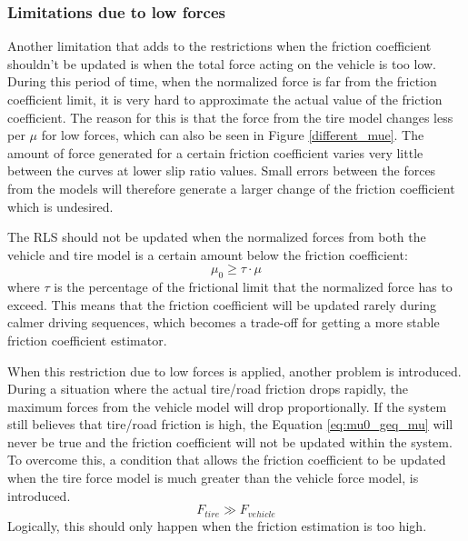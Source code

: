 \subsubsection{Limitations due to low forces}
Another limitation that adds to the restrictions when the friction coefficient shouldn't be updated is when the total force acting on the vehicle is too low. During this period of time, when the normalized force is far from the friction coefficient limit, it is very hard to approximate the actual value of the friction coefficient. The reason for this is that the force from the tire model changes less per $ \mu $ for low forces, which can also be seen in Figure \ref{different_mue}. The amount of force generated for a certain friction coefficient varies very little between the curves at lower slip ratio values. Small errors between the forces from the models will therefore generate a larger change of the friction coefficient which is undesired. 

The RLS should not be updated when the normalized forces from both the vehicle and tire model is a certain amount below the friction coefficient:
\begin{equation}
	\mu_{0} \geq \tau \cdot \mu
	\label{eq:mu0_geq_mu}
\end{equation}
where $ \tau $ is the percentage of the frictional limit that the normalized force has to exceed. This means that the friction coefficient will be updated rarely during calmer driving sequences, which becomes a trade-off for getting a more stable friction coefficient estimator. 

When this restriction due to low forces is applied, another problem is introduced. During a situation where the actual tire/road friction drops rapidly, the maximum forces from the vehicle model will drop proportionally. If the system still believes that tire/road friction is high, the Equation \ref{eq:mu0_geq_mu} will never be true and the friction coefficient will not be updated within the system. To overcome this, a condition that allows the friction coefficient to be updated when the tire force model is much greater than the vehicle force model, is introduced.
\begin{equation}
	F_{tire} \gg F_{vehicle}
\end{equation}
Logically, this should only happen when the friction estimation is too high.
